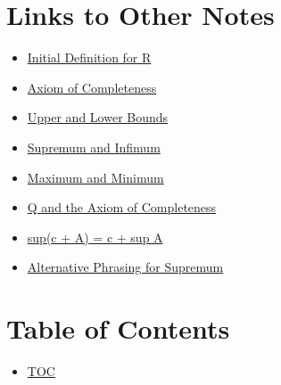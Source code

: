 \section*{Links to Other Notes}
\begin{itemize}
  \item \hyperref[202501180703]{Initial Definition for R}
  \item \hyperref[202501180727]{Axiom of Completeness}
  \item \hyperref[202501180734]{Upper and Lower Bounds}
  \item \hyperref[202501180743]{Supremum and Infimum}
  \item \hyperref[202501181241]{Maximum and Minimum}
  \item \hyperref[202501181257]{Q and the Axiom of Completeness}
  \item \hyperref[202501181310]{sup(c + A) = c + sup A}
  \item \hyperref[202501181335]{Alternative Phrasing for Supremum}
\end{itemize}

\section*{Table of Contents}

\begin{itemize}
  \item \hyperref[toc]{TOC}
\end{itemize}

